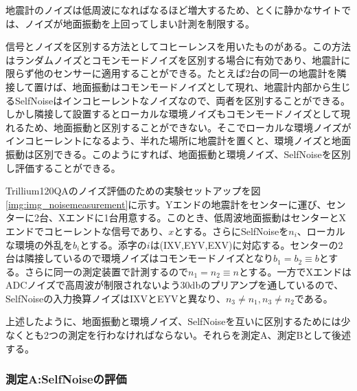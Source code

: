 地震計のノイズは低周波になればなるほど増大するため、とくに静かなサイトでは、ノイズが地面振動を上回ってしまい計測を制限する。


信号とノイズを区別する方法としてコヒーレンスを用いたものがある\cite{peterson1980test}。この方法はランダムノイズとコモンモードノイズを区別する場合に有効であり、地震計に限らず他のセンサーに適用することができる\cite{barzilai1998technique}。たとえば2台の同一の地震計を隣接して置けば、地面振動はコモンモードノイズとして現れ、地震計内部から生じるSelfNoiseはインコヒーレントなノイズなので、両者を区別することができる。しかし隣接して設置するとローカルな環境ノイズもコモンモードノイズとして現れるため、地面振動と区別することができない。そこでローカルな環境ノイズがインコヒーレントになるよう、半れた場所に地震計を置くと、環境ノイズと地面振動は区別できる。このようにすれば、地面振動と環境ノイズ、SelfNoiseを区別し評価することができる。


Trillium120QAのノイズ評価のための実験セットアップを図\ref{img:img_noisemeasurement}に示す。Yエンドの地震計をセンターに運び、センターに2台、Xエンドに1台用意する。このとき、低周波地面振動はセンターとXエンドでコヒーレントな信号であり、$x$とする。さらにSelfNoiseを$n_i$、ローカルな環境の外乱を$b_i$とする。添字の$i$は(IXV,EYV,EXV)に対応する。センターの2台は隣接しているので環境ノイズはコモンモードノイズとなり$b_1=b_2\equiv b$とする。さらに同一の測定装置で計測するので$n_1=n_2\equiv n$とする。一方でXエンドはADCノイズで高周波が制限されないよう30dbのプリアンプを通しているので、SelfNoiseの入力換算ノイズはIXVとEYVと異なり、$n_3\neq n_1,n_3\neq n_2$である。


上述したように、地面振動と環境ノイズ、SelfNoiseを互いに区別するためには少なくとも2つの測定を行わなければならない。それらを測定A、測定Bとして後述する。


\subsubsection{測定A:SelfNoiseの評価}
\begin{figure}[H]
  \begin{center}
  \end{center}
  \caption{
  }\label{img:img_testA}
\end{figure}

